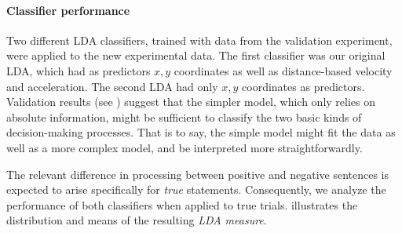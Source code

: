 \documentclass{article}
\begin{document}
\paragraph{Classifier performance}
Two different LDA classifiers, trained with data from the validation experiment, were applied to the new experimental data. The first classifier was our original LDA, which had as predictors $x,y$ coordinates as well as distance-based velocity and acceleration. The second LDA had only $x,y$ coordinates as predictors. Validation results (see ) suggest that the simpler model, which only relies on absolute information, might be sufficient to classify the two basic kinds of decision-making processes. That is to say, the simple model might fit the data as well as a more complex model, and be interpreted more straightforwardly. 

The relevant difference in processing between positive and negative sentences is expected to arise specifically for \emph{true} statements. Consequently, we analyze the performance of both classifiers when applied to true trials.  illustrates the distribution and means of the resulting \textit{LDA measure}. 
\end{document}
